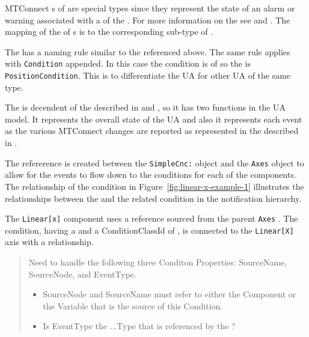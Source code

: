 MTConnect s of   are special types since they represent the state of an alarm or warning associated with a  of the . For more information on the  see \cite{MTCPart2} and \cite{MTCPart3}. The mapping of the   of s is to the corresponding  sub-type of .

The  has a naming rule similar to the  referenced above. The same rule applies with \texttt{Condition} appended. In this case the condition is of   so the  is \texttt{PositionCondition}. This is to differentiate the UA  for other UA  of the same type.

The  is decendent of the  described in \cite{UAPart5} and \cite{UAPart9}, so it has two functions in the UA model. It represents the overall state of the UA  and also it represents each event as the various MTConnect  changes are reported as represented in the  described in \cite{MTCPart3}.

The  refererence is created between the \texttt{SimpleCnc:} object and the \texttt{Axes} object to allow for the events to flow down to the conditions for each of the components. The relationship of the condition in Figure~\ref{fig:linear-x-example-1} illustrates the relationships between the  and the related condition in the notification hierarchy.

 The \texttt{Linear[x]} component uses a  reference sourced from the parent \texttt{Axes} . The condition, having a  and a ConditionClassId of , is connected to the \texttt{Linear[X]} axis with a  relationship. 

\begin{quote}
    \color{red} Need to handle the following three Conditon Properties: SourceName, SourceNode, and EventType.
    \begin{itemize}
        \item SourceNode and SourceName must refer to either the Component or the Variable that is the source of this Condition.
        \item Is EventType the ...Type that is referenced by the ?
    \end{itemize}
\end{quote}

